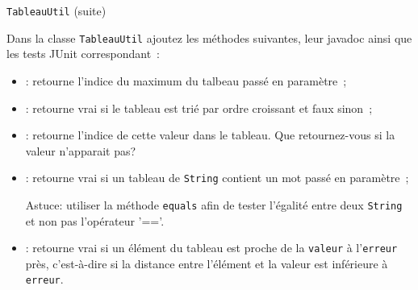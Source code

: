 \documentclass[a4paper,11pt]{article}
\begin{document}
	\begin{Exercice}{\texttt{TableauUtil} (suite)}	

		Dans la classe \texttt{TableauUtil} ajoutez les méthodes suivantes, leur javadoc ainsi que les tests JUnit correspondant~:
	\begin{itemize}
		\item {}: 
				retourne l'indice du maximum du talbeau passé en paramètre~;
		\item {}: 
				retourne vrai si le tableau est trié par ordre croissant et 	
				faux sinon~;
		\item {}: 
				retourne l'indice de cette valeur dans le tableau. 
				Que retournez-vous si la valeur n'apparait pas?
		\item  {}: 
			retourne vrai si un tableau de \texttt{String} contient un mot passé en
			paramètre~;
			
			Astuce: utiliser la méthode \texttt{equals} afin de tester 
			l'égalité entre deux \texttt{String} et non pas l'opérateur '=='.
		\item  {}: 
			retourne vrai si un élément du tableau est proche de la \texttt{valeur}
			à l'\texttt{erreur} près, c'est-à-dire si la distance entre l'élément 
			et la valeur est inférieure à \texttt{erreur}.
%	
	\end{itemize}
	\end{Exercice}
	
\end{document}
